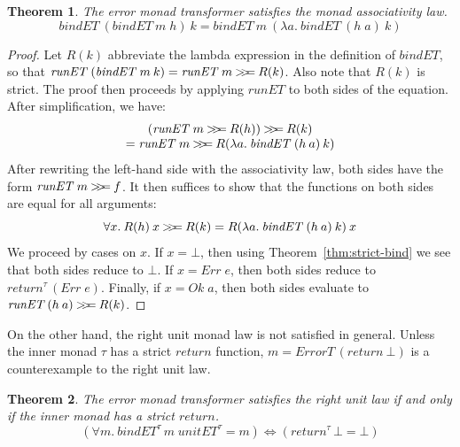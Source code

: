 \documentclass{sigplanconf}
\newcommand{\hsbind}{\mathbin{>\mkern-6mu>\mkern-6.5mu=}}
\newcommand{\hsc}[1]{\ensuremath{\mathit{#1}}}
\newcommand{\tT}{\tau}
\newtheorem{theorem}{Theorem}
\theoremstyle{definition}
\begin{document}
\begin{theorem}
\label{thm:errorT-assoc}
The error monad transformer satisfies the monad associativity law.
\begin{equation*}
\hsc{bindET}\:(\hsc{bindET}\:m\;h)\:k
= \hsc{bindET}\:m\:(\lambda{a}.\:\hsc{bindET}\:(h\;a)\:k)
\end{equation*}
\end{theorem}
\begin{proof}
Let $R(k)$ abbreviate the lambda expression in the definition of \hsc{bindET}, so that $\hsc{runET}\:(\hsc{bindET}\:m\:k) = \hsc{runET}\:m \hsbind R(k)$. Also note that $R(k)$ is strict. The proof then proceeds by applying \hsc{runET} to both sides of the equation. After simplification, we have:
%
\begin{multline*}
(\hsc{runET}\:m \hsbind R(h)) \hsbind R(k) \\[-\jot]
= \hsc{runET}\:m \hsbind R(\lambda{a}.\:\hsc{bindET}\:(h\:a)\:k)
\end{multline*}
%
After rewriting the left-hand side with the associativity law, both sides have the form $\hsc{runET}\:m \hsbind f$. It then suffices to show that the functions on both sides are equal for all arguments:
%
\begin{equation*}
\forall{x}.\: R(h)\:x \hsbind R(k) = R(\lambda{a}.\:\hsc{bindET}\:(h\:a)\:k)\:x
\end{equation*}
%
We proceed by cases on $x$. If $x = \bot$, then using Theorem~\ref{thm:strict-bind} we see that both sides reduce to $\bot$. If $x = \hsc{Err}\;e$, then both sides reduce to $\hsc{return}^\tau\,(\hsc{Err}\;e)$. Finally, if $x = \hsc{Ok}\;a$, then both sides evaluate to $\hsc{runET}\,(h\:a) \hsbind R(k)$.
\end{proof}

On the other hand, the right unit monad law is not satisfied in general. Unless the inner monad $\tT$ has a strict \hsc{return} function, $m = \hsc{ErrorT}\,(\hsc{return}\:\bot)$ is a counterexample to the right unit law.

\begin{theorem}
\label{thm:errorT-right-unit}
The error monad transformer satisfies the right unit law if and only if the inner monad has a strict \hsc{return}.
%
\begin{equation*}
(\forall{m}.\:\hsc{bindET}^\tT\,m\;\hsc{unitET}^\tT = m) \Longleftrightarrow
(\hsc{return}^\tT\,\bot = \bot)
\end{equation*}
\end{theorem}
\end{document}
